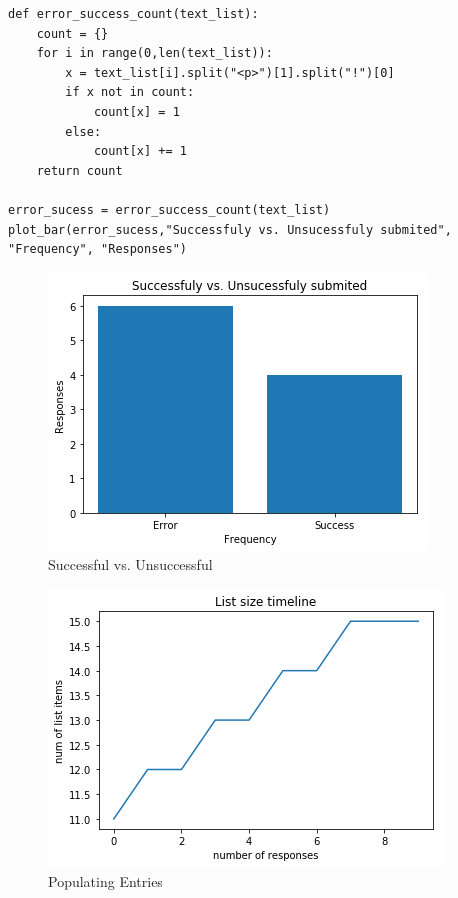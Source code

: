 \documentclass{WeSTassignment}
\begin{document}
\begin{verbatim}
def error_success_count(text_list):
    count = {}
    for i in range(0,len(text_list)):
        x = text_list[i].split("<p>")[1].split("!")[0]
        if x not in count:
            count[x] = 1
        else:
            count[x] += 1
    return count

error_sucess = error_success_count(text_list)
plot_bar(error_sucess,"Successfuly vs. Unsucessfuly submited", "Frequency", "Responses")

\end{verbatim}

\begin{figure}[h]
  \begin{center}
  \includegraphics[scale = 0.90]{stat.png}
  \caption*{Successful vs. Unsuccessful}
  \label{fig:sincosine}
  \end{center}  
\end{figure}

\begin{figure}[h]
  \begin{center}
  \includegraphics[scale = 0.90]{list_size_timeline.png}
  \caption*{Populating Entries}
  \label{fig:sincosine}
  \end{center}  
\end{figure}
\end{document}
